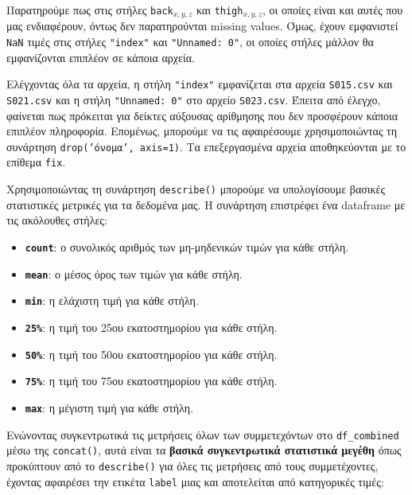         Παρατηρούμε πως στις στήλες \texttt{back}\(_{x,y,z}\) και \texttt{thigh}\(_{x,y,z}\), οι οποίες είναι και αυτές που μας ενδιαφέρουν, όντως δεν παρατηρούνται missing values.
        Όμως, έχουν εμφανιστεί \texttt{NaN} τιμές στις στήλες \texttt{"index"} και \texttt{"Unnamed: 0"}, οι οποίες στήλες μάλλον θα εμφανίζονται επιπλέον σε κάποια αρχεία.

        Ελέγχοντας όλα τα αρχεία, η στήλη \texttt{"index"} εμφανίζεται στα αρχεία \texttt{S015.csv} και \texttt{S021.csv} και η στήλη \texttt{"Unnamed: 0"} στο αρχείο \texttt{S023.csv}.
        Έπειτα από έλεγχο, φαίνεται πως πρόκειται για δείκτες αύξουσας αρίθμησης που δεν προσφέρουν κάποια επιπλέον πληροφορία.
        Επομένως, μπορούμε να τις αφαιρέσουμε χρησιμοποιώντας τη συνάρτηση \texttt{drop('όνομα', axis=1)}. Τα επεξεργασμένα αρχεία αποθηκεύονται με το επίθεμα \texttt{fix}.

        Χρησιμοποιώντας τη συνάρτηση \texttt{describe()} μπορούμε να υπολογίσουμε βασικές στατιστικές μετρικές για τα δεδομένα μας.
        Η συνάρτηση επιστρέφει ένα dataframe με τις ακόλουθες στήλες:

        \vspace{-3mm}
        \begin{itemize}[label={\tiny \blacksquare}]
            \addtolength\itemsep{-3mm}
            \item \texttt{\textbf{count}}: ο συνολικός αριθμός των μη-μηδενικών τιμών για κάθε στήλη.
            \item \texttt{\textbf{mean}}: ο μέσος όρος των τιμών για κάθε στήλη.
            \item \texttt{\textbf{min}}: η ελάχιστη τιμή για κάθε στήλη.
            \item \texttt{\textbf{25\%}}: η τιμή του 25ου εκατοστημορίου για κάθε στήλη.
            \item \texttt{\textbf{50\%}}: η τιμή του 50ου εκατοστημορίου για κάθε στήλη.
            \item \texttt{\textbf{75\%}}: η τιμή του 75ου εκατοστημορίου για κάθε στήλη.
            \item \texttt{\textbf{max}}: η μέγιστη τιμή για κάθε στήλη.
        \end{itemize}

        Ενώνοντας συγκεντρωτικά τις μετρήσεις όλων των συμμετεχόντων στο \texttt{df\_combined} μέσω της \texttt{concat()},
        αυτά είναι τα \textbf{βασικά συγκεντρωτικά στατιστικά μεγέθη} όπως προκύπτουν από το \texttt{describe()}
        για όλες τις μετρήσεις από τους συμμετέχοντες, έχοντας αφαιρέσει την ετικέτα \texttt{label} μιας και αποτελείται από κατηγορικές τιμές:

